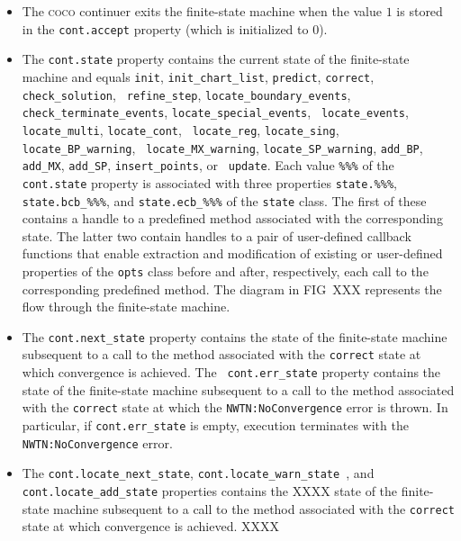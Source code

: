 \documentclass{article}
\begin{document}
\begin{itemize}
\item The \textsc{coco} continuer exits the finite-state machine when the
value $1$ is stored in the \texttt{cont.accept} property (which is
initialized to $0$).

\item The \texttt{cont.state} property contains the current state of the
finite-state machine and equals \texttt{init}, \texttt{init\_chart\_list}, 
\texttt{predict}, \texttt{correct}, \texttt{check\_solution}, \texttt{%
refine\_step}, \texttt{locate\_boundary\_events}, \texttt{%
check\_terminate\_events}, \texttt{locate\_special\_events}, \texttt{%
locate\_events}, \texttt{locate\_multi}, \texttt{locate\_cont}, \texttt{%
locate\_reg}, \texttt{locate\_sing}, \texttt{locate\_BP\_warning}, \texttt{%
locate\_MX\_warning}, \texttt{locate\_SP\_warning}, \texttt{add\_BP}, 
\texttt{add\_MX}, \texttt{add\_SP}, \texttt{insert\_points}, or \texttt{%
update}. Each value \texttt{\%\%\%} of the \texttt{cont.state} property is
associated with three properties \texttt{state.\%\%\%}, \texttt{%
state.bcb\_\%\%\%}, and \texttt{state.ecb\_\%\%\%} of the \texttt{state}
class. The first of these contains a handle to a predefined method
associated with the corresponding state. The latter two contain handles to a
pair of user-defined callback functions that enable extraction and
modification of existing or user-defined properties of the \texttt{opts}
class before and after, respectively, each call to the corresponding
predefined method. The diagram in FIG\ XXX represents the flow through the
finite-state machine.

\item The \texttt{cont.next\_state} property contains the state of the
finite-state machine subsequent to a call to the method associated with the 
\texttt{correct} state at which convergence is achieved. The \texttt{%
cont.err\_state} property contains the state of the finite-state machine
subsequent to a call to the method associated with the \texttt{correct}
state at which the \texttt{NWTN:NoConvergence} error is thrown. In
particular, if \texttt{cont.err\_state} is empty, execution terminates with
the \texttt{NWTN:NoConvergence} error.

\item The \texttt{cont.locate\_next\_state}, \texttt{cont.locate\_warn\_state%
}, and \texttt{cont.locate\_add\_state} properties contains the XXXX state
of the finite-state machine subsequent to a call to the method associated
with the \texttt{correct} state at which convergence is achieved. XXXX
\end{itemize}
\end{document}
